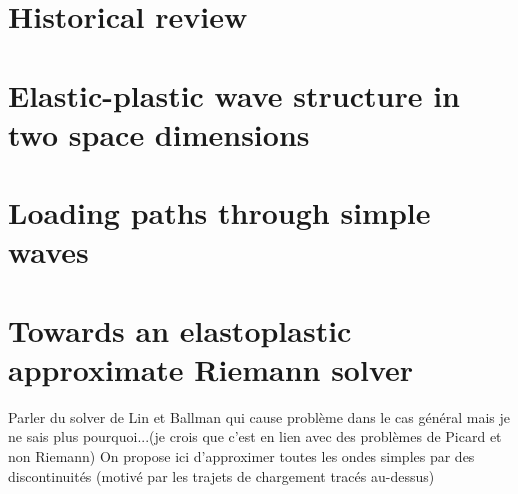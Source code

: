\section{Historical review}
\label{sec:review}


\section{Elastic-plastic wave structure in two space dimensions}
\label{sec:charac_plast}


\section{Loading paths through simple waves}
\label{sec:stress_paths}


\section{Towards an elastoplastic approximate Riemann solver}
\label{sec:ep_Riemman_solver}

Parler du solver de Lin et Ballman qui cause problème dans le cas général mais je ne sais plus pourquoi...(je crois que c'est en lien avec des problèmes de Picard et non Riemann)
On propose ici d'approximer toutes les ondes simples par des discontinuités (motivé par les trajets de chargement tracés au-dessus)
\cite{Lin_et_Ballman}
